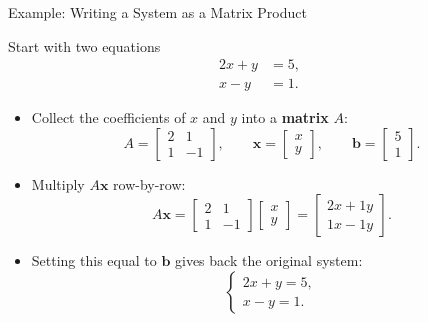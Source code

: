 \documentclass{beamer}
\begin{document}
\begin{frame}{Example: Writing a System as a Matrix Product}

\begin{block}{Start with two equations}
\[
\begin{aligned}
2x + y &= 5,\\
x - y &= 1.
\end{aligned}
\]
\end{block}

\begin{itemize}
    \item Collect the coefficients of \(x\) and \(y\) into a \textbf{matrix} \(A\):
    \[
    A = \begin{bmatrix} 2 & 1 \\[2pt] 1 & -1 \end{bmatrix},
    \qquad
    \mathbf{x} = \begin{bmatrix} x \\[2pt] y \end{bmatrix},
    \qquad
    \mathbf{b} = \begin{bmatrix} 5 \\[2pt] 1 \end{bmatrix}.
    \]
    \item Multiply \(A\mathbf{x}\) row-by-row:
    \[
    A\mathbf{x} =
    \begin{bmatrix}
        2 & 1\\
        1 & -1
    \end{bmatrix}
    \begin{bmatrix}
        x \\ y
    \end{bmatrix}
    =
    \begin{bmatrix}
        2x + 1y\\
        1x - 1y
    \end{bmatrix}.
    \]
    \item Setting this equal to \(\mathbf{b}\) gives back the original system:
    \[
    \begin{cases}
    2x + y = 5,\\
    x - y = 1.
    \end{cases}
    \]
\end{itemize}
\end{frame}
\end{document}
